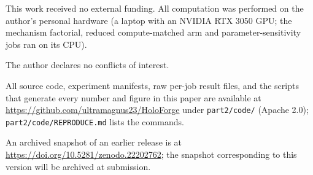 \documentclass{optica-article}
\begin{document}
\begin{backmatter}

This work received no external funding. All computation was performed on
the author's personal hardware (a laptop with an NVIDIA RTX 3050 GPU; the
mechanism factorial, reduced compute-matched arm and parameter-sensitivity
jobs ran on its CPU).

The author declares no conflicts of interest.

{\sloppy
All source code, experiment manifests, raw per-job result files, and the
scripts that generate every number and figure in this paper are available
at \url{https://github.com/ultramagnus23/HoloForge} under
\texttt{part2/code/} (Apache 2.0); \texttt{part2/code/REPRODUCE.md} lists
the commands.
\par}
An archived snapshot of an earlier release is at
\url{https://doi.org/10.5281/zenodo.22202762}; the snapshot corresponding to
this version will be archived at submission.

\end{backmatter}


\end{document}
